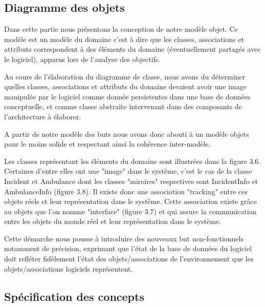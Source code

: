 \subsection{Diagramme des objets}

	Dans cette partie nous présentons la conception de notre modèle objet. Ce
	modèle est un modèle du domaine c'est à dire que les classes, associations
	et attributs correspondent à des éléments du domaine (éventuellement
	partagés avec le logiciel), apparus lors de l'analyse des objectifs. 

	Au cours de l'élaboration du diagramme de classe, nous avons du déterminer
	quelles classes, associations et attributs du domaine devaient avoir une
	image manipulée par le logiciel comme donnée persistentes dans une base de
	données conceptuelle, et comme classe abstraite intervenant dans des
	composants de l'architecture à élaborer. 

	A partir de notre modèle des buts nous avons donc abouti à un modèle objets
	pour le moins solide et respectant ainsi la cohérence inter-modèle. 

	Les classes représentant les éléments du domaine sont illustrées dans la
	figure 3.6. Certaines d'entre elles ont une "image" dans le système, c'est
	le cas de la classe Incident et Ambulance dont les classes "miroires"
	respectives sont IncidentInfo et AmbulanceInfo (figure 3.8). Il existe donc
	une association "tracking" entre ces objets réels et leur représentation
	dans le système. Cette association existe grâce au objets que l'on nomme
	"interface" (figure 3.7) et qui assure la communication entre les objets du
	monde réel et leur représentation dans le système. 

	Cette démarche nous pousse à introduire des nouveaux but non-fonctionnels
	notamment de précision, exprimant que l'état de la base de données du
	logiciel doit refléter fidèlement l'état des objets/associations de
	l'environnement que les objets/associations logiciels représentent. 


\subsection{Spécification des concepts}
